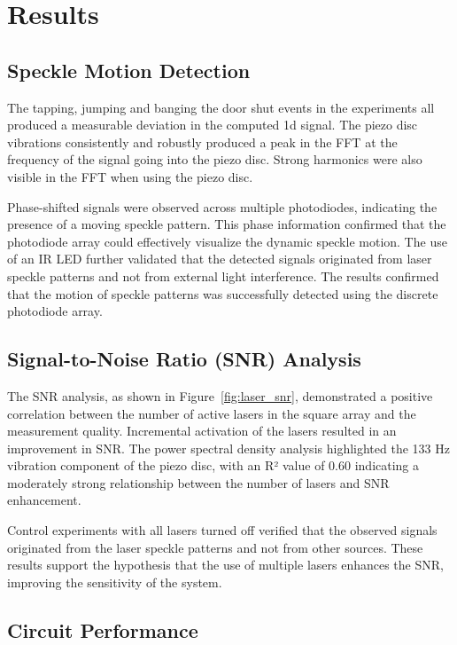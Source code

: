 \section{Results}
\label{sec:results}

\subsection{Speckle Motion Detection}

The tapping, jumping and banging the door shut events in the experiments all produced a measurable deviation in the computed 1d signal. 
The piezo disc vibrations consistently and robustly produced a peak in the FFT at the frequency of the signal going into the piezo disc. 
Strong harmonics were also visible in the FFT when using the piezo disc.

Phase-shifted signals were observed across multiple photodiodes, indicating the presence of a moving speckle pattern. 
This phase information confirmed that the photodiode array could effectively visualize the dynamic speckle motion. 
The use of an IR LED further validated that the detected signals originated from laser speckle patterns and not from external light interference.
The results confirmed that the motion of speckle patterns was successfully detected using the discrete photodiode array. 

\subsection{Signal-to-Noise Ratio (SNR) Analysis}

The SNR analysis, as shown in Figure~\ref{fig:laser_snr}, demonstrated a positive correlation between the number of active lasers in the square array and the measurement quality. 
Incremental activation of the lasers resulted in an improvement in SNR.
The power spectral density analysis highlighted the 133 Hz vibration component of the piezo disc, 
with an R² value of 0.60 indicating a moderately strong relationship between the number of lasers and SNR enhancement.

Control experiments with all lasers turned off verified that the observed signals originated from the 
laser speckle patterns and not from other sources. 
These results support the hypothesis that the use of multiple lasers enhances the SNR, improving the sensitivity of the system.

\subsection{Circuit Performance}

